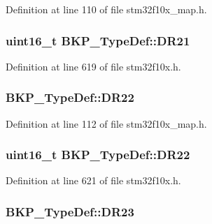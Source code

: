 Definition at line 110 of file stm32f10x\+\_\+map.\+h.

\subsubsection[{\texorpdfstring{D\+R21}{DR21}}]{ {\bf uint16\+\_\+t} B\+K\+P\+\_\+\+Type\+Def\+::\+D\+R21}\hypertarget{struct_b_k_p___type_def_a89180a525bf44cd1747dd97102de7a5a}{}\label{struct_b_k_p___type_def_a89180a525bf44cd1747dd97102de7a5a}


Definition at line 619 of file stm32f10x.\+h.

\subsubsection[{\texorpdfstring{D\+R22}{DR22}}]{ B\+K\+P\+\_\+\+Type\+Def\+::\+D\+R22}\hypertarget{struct_b_k_p___type_def_af9a59f4e67aefd60d05344b96be945ab}{}\label{struct_b_k_p___type_def_af9a59f4e67aefd60d05344b96be945ab}


Definition at line 112 of file stm32f10x\+\_\+map.\+h.

\subsubsection[{\texorpdfstring{D\+R22}{DR22}}]{ {\bf uint16\+\_\+t} B\+K\+P\+\_\+\+Type\+Def\+::\+D\+R22}\hypertarget{struct_b_k_p___type_def_a9f077d302b8fb5f113416919de36c1fb}{}\label{struct_b_k_p___type_def_a9f077d302b8fb5f113416919de36c1fb}


Definition at line 621 of file stm32f10x.\+h.

\subsubsection[{\texorpdfstring{D\+R23}{DR23}}]{ B\+K\+P\+\_\+\+Type\+Def\+::\+D\+R23}\hypertarget{struct_b_k_p___type_def_a3e8007bb4478835c3d7970e8fba73dcf}{}\label{struct_b_k_p___type_def_a3e8007bb4478835c3d7970e8fba73dcf}


